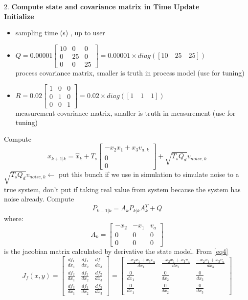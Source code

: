 \documentclass[12pt,a4paper]{article}
\begin{document}
	2. \textbf{Compute state and covariance matrix in Time Update}\\
	\textbf{Initialize}
	\begin{itemize}
		\item { sampling time (s) , up to user}
		\item \(Q = 0.00001
		\begin{bmatrix}
			10 & 0  & 0  \\
			0  & 25 & 0  \\
			0  & 0  & 25 
		\end{bmatrix} 
		= 0.00001 \times diag([10\quad 25\quad 25])\) \\process covariance matrix, smaller is truth in process model (use for tuning)
		\item \(R = 0.02
		\begin{bmatrix}
			1 & 0 & 0 \\
			0 & 1 & 0 \\
			0 & 0 & 1 
		\end{bmatrix} 
		= 0.02 \times diag([1\quad 1\quad 1])\) \\measurement covariance matrix, smaller is truth in measurement (use for tuning)
	\end{itemize}
	Compute \[\hat{x}_{k+1|k} = \hat{x}_k + T_s
	\begin{bmatrix}
		-x_2 x_1 + x_3 v_{a,k} \\
		0                      \\
		0                      
	\end{bmatrix} + \boxed{\sqrt{T_s Q_d}v_{noise,k}}\]
	\(\boxed{\sqrt{T_s Q_d}v_{noise,k}}\leftarrow\) put this bunch if we use in simulation to simulate noise to a true system, don't put if taking real value from system because the system has noise already.
	Compute
	\[P_{k+1|k} = A_kP_{k|k}A^T_k+Q\]
	where:
	\[A_k =
	\begin{bmatrix}
		-x_2 & -x_1 & v_a \\
		0    & 0    & 0   \\
		0    & 0    & 0   
	\end{bmatrix}\]
	is the jacobian matrix calculated by derivative the state model. From \autoref{eq4}
	\[J_f(x,y) =\begin{bmatrix}
		\frac{df_1}{dx_1} & \frac{df_1}{dx_2} & \frac{df_1}{dx_3} \\
		\frac{df_2}{dx_1} & \frac{df_2}{dx_2} & \frac{df_2}{dx_3} \\
		\frac{df_3}{dx_1} & \frac{df_3}{dx_2} & \frac{df_3}{dx_3}
	\end{bmatrix} = 
	\begin{bmatrix}
		\frac{-x_2x_1+x_3v_a}{dx_1} & \frac{-x_2x_1+x_3v_a}{dx_2} & \frac{-x_2x_1+x_3v_a}{dx_3} \\
		\frac{0}{dx_1}              & \frac{0}{dx_2}              & \frac{0}{dx_3}              \\
		\frac{0}{dx_1}              & \frac{0}{dx_2}              & \frac{0}{dx_3}              
	\end{bmatrix}
	\]
\end{document}
